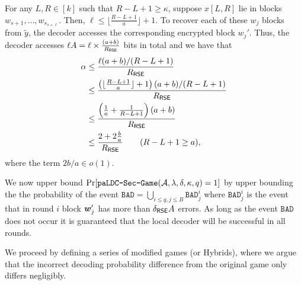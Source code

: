 \begin{IEEEproof}     
    For any $L,R \in [k]$ such that $R - L + 1 \geq \kappa$, suppose $x[L,R]$ lie in blocks $w_{s+1},\dots,w_{s_{s + \ell}}$.
    Then, $\ell \leq \lfloor{\frac{R - L + 1}{a}}\rfloor + 1$.
    To recover each of these $w_j$ blocks from $\widetilde y$, the decoder accesses the corresponding encrypted block $w_j'$. 
    Thus, the decoder accesses $\ell A = \ell \times \frac{(a + b)}{R_{\mathsf{RSE}}}$ bits in total and we have that 
        \begin{align*}
        \alpha &\leq \frac{\ell(a + b)/(R - L + 1)}{R_{\mathsf{RSE}}} \\
               &\leq \frac{\left(\lfloor{\frac{R - L + 1}{a}}\rfloor + 1\right)( a + b)/(R - L + 1)}{R_{\mathsf{RSE}}} \\
               &\leq \frac{\left(\frac{1}{a} + \frac{1}{R - L + 1} \right)(a + b)}{R_{\mathsf{RSE}}}\\
               &\leq \frac{2 + 2\frac{b}{a}}{R_{\mathsf{RSE}}} \tag{$R - L + 1 \geq a$},
    \end{align*}
    where the term ${2b/a \in o(1)}$.
    
    We now upper bound $\Pr[\texttt{paLDC-Sec-Game}(\mathcal{A},\lambda,\delta,\kappa,q) = 1]$ by upper bounding the the probability of the event $\mathtt{BAD} = \bigcup_{i\leq q, j \leq B} \mathtt{BAD}_{j}^i$ where $\mathtt{BAD}_j^i$ is the event that in round $i$  block $\boldsymbol{w}'_j$ has more than $\delta_{\mathsf{RSE}} A$ errors. As long as the event $\mathtt{BAD}$ does not occur it is guaranteed that the local decoder will be successful in all rounds. 
    
    We proceed by defining a series of modified games (or Hybrids), where we argue that the incorrect decoding probability difference from the original game only differs negligibly. 


\end{IEEEproof}
